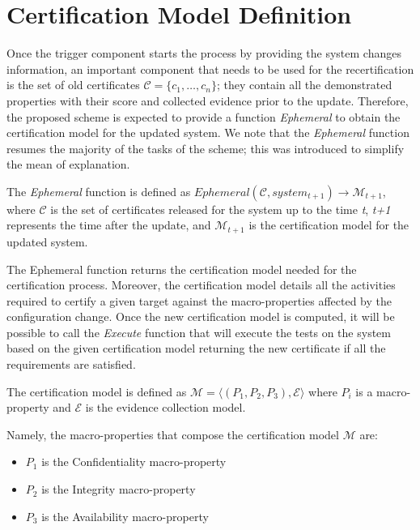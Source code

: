 \section{Certification Model Definition}
Once the trigger component starts the process by providing the system changes information, an important component that needs to be used for the recertification is the set of old certificates \(\mathcal{C} = \{c_1, \dots, c_n\}\); they contain all the demonstrated properties with their score and collected evidence prior to the update. Therefore, the proposed scheme is expected to provide a function \textit{Ephemeral} to obtain the certification model for the updated system. We note that the \textit{Ephemeral} function resumes the majority of the tasks of the scheme; this was introduced to simplify the mean of explanation.

\begin{defn}
The \textit{Ephemeral} function is defined as \(Ephemeral(\mathcal{C}, system_{t+1}) \rightarrow {\mathcal{M}}_{t+1} \), where 
\(\mathcal{C}\) is the set of certificates released for the system up to the time \textit{t}, \textit{t+1} represents the time after the update, and \(\mathcal{M}_{t+1}\) is the certification model for the updated system.
\end{defn}

The Ephemeral function returns the certification model needed for the certification process. Moreover, the certification model details all the activities required to certify a given target against the macro-properties affected by the configuration change. Once the new certification model is computed, it will be possible to call the \textit{Execute} function that will execute the tests on the system based on the given certification model returning the new certificate if all the requirements are satisfied. 

\begin{defn}
The certification model is defined as 
\(\mathcal{M} = \langle ( P_1, P_2, P_3 ), \mathcal{E} \rangle\) where \(P_i\) is a macro-property and \( \mathcal{E} \) is the evidence collection model.
\end{defn}
Namely, the macro-properties that compose the certification model \(\mathcal{M}\) are:
\begin{itemize}
    \item \(P_1\) is the Confidentiality macro-property
    \item \(P_2\) is the Integrity macro-property
    \item \(P_3\) is the Availability macro-property
\end{itemize}
 
